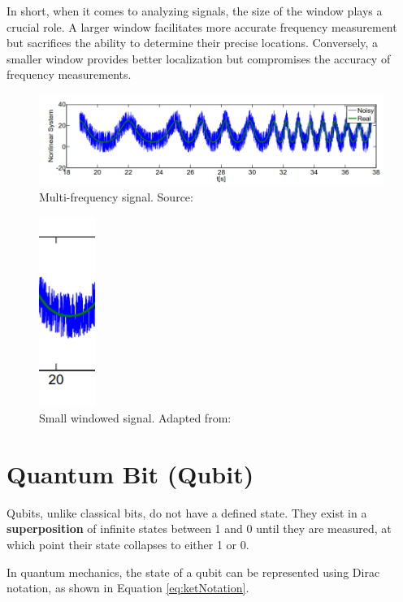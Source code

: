 		\par In short, when it comes to analyzing signals, the size of the window plays a crucial role. A larger window facilitates more accurate frequency measurement but sacrifices the ability to determine their precise locations. Conversely, a smaller window provides better localization but compromises the accuracy of frequency measurements.

	
		\begin{figure}[h]
			\centering
			\includegraphics[width=1\linewidth]{images/noisySignal}
			\caption[Multi-frequency signal]{Multi-frequency signal. Source: \cite{olama2011design}}
			\label{fig:noisysignal}
		\end{figure}
		
		
		\begin{figure}[!h]
			\centering
			\includegraphics[width=0.1\linewidth]{images/windowedNoisySignal}
			\caption[Windowed signal]{Small windowed signal. Adapted from: \cite{olama2011design}}
			\label{fig:windowednoisysignal}
		\end{figure}

	
	\section{Quantum Bit (Qubit)}
		\par Qubits, unlike classical bits, do not have a defined state. They exist in a \textbf{superposition} of infinite states between 1 and 0 until they are measured, at which point their state collapses to either 1 or 0.
		
		\par In quantum mechanics, the state of a qubit can be represented using Dirac notation, as shown in Equation \ref{eq:ketNotation}.
		
